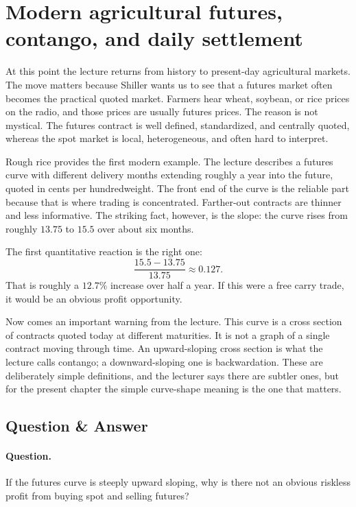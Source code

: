 \section{Modern agricultural futures, contango, and daily settlement}

At this point the lecture returns from history to present-day agricultural markets. The move matters because Shiller wants us to see that a futures market often becomes the practical quoted market. Farmers hear wheat, soybean, or rice prices on the radio, and those prices are usually futures prices. The reason is not mystical. The futures contract is well defined, standardized, and centrally quoted, whereas the spot market is local, heterogeneous, and often hard to interpret.

Rough rice provides the first modern example. The lecture describes a futures curve with different delivery months extending roughly a year into the future, quoted in cents per hundredweight. The front end of the curve is the reliable part because that is where trading is concentrated. Farther-out contracts are thinner and less informative. The striking fact, however, is the slope: the curve rises from roughly $13.75$ to $15.5$ over about six months.

The first quantitative reaction is the right one:
\begin{equation}
\frac{15.5-13.75}{13.75}\approx 0.127.
\end{equation}
That is roughly a $12.7\%$ increase over half a year. If this were a free carry trade, it would be an obvious profit opportunity.

Now comes an important warning from the lecture. This curve is a cross section of contracts quoted today at different maturities. It is not a graph of a single contract moving through time. An upward-sloping cross section is what the lecture calls contango; a downward-sloping one is backwardation. These are deliberately simple definitions, and the lecturer says there are subtler ones, but for the present chapter the simple curve-shape meaning is the one that matters.

\subsection{Question \& Answer}

\paragraph{Question.} If the futures curve is steeply upward sloping, why is there not an obvious riskless profit from buying spot and selling futures?

